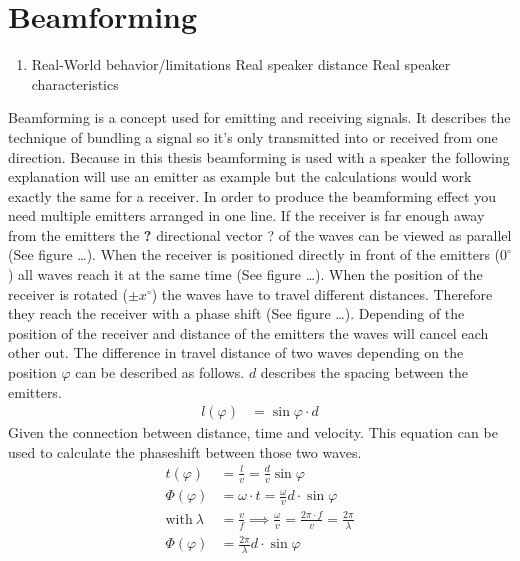 \section{Beamforming}\label{sec:theory:beam}

\begin{enumerate}
  \item Real-World behavior/limitations
  \subitem Real speaker distance
  \subitem Real speaker characteristics
\end{enumerate}

Beamforming is a concept used for emitting and receiving signals. It describes the technique of bundling a signal so it's only transmitted into or received from one direction. Because in this thesis beamforming is used with a speaker the following explanation will use an emitter as example but the calculations would work exactly the same for a receiver.\p
%
In order to produce the beamforming effect you need multiple emitters arranged in one line.
If the receiver is far enough away from the emitters the \textbf{?} directional vector ? of the waves can be viewed as parallel (See figure \dots). When the receiver is positioned directly in front of the emitters (\(0^\circ\)) all waves reach it at the same time (See figure \dots).
When the position of the receiver is rotated (\(\pm x^\circ\)) the waves have to travel different distances. Therefore they reach the receiver with a phase shift (See figure \dots). Depending of the position of the receiver and distance of the emitters the waves will cancel each other out.\p
%
The difference in travel distance of two waves depending on the position \(\varphi\) can be described as follows. \(d\) describes the spacing between the emitters.
%
\begin{align}
  l(\varphi) &= \sin \varphi \cdot d
\end{align}
%
Given the connection between distance, time and velocity. This equation can be used to calculate the phaseshift between those two waves.
%
\begin{align}
  t(\varphi)     &= \frac{l}{v} = \frac{d}{v} \sin \varphi \\[1em]
  \Phi(\varphi)  &= \omega \cdot t = \frac{\omega}{v} d \cdot \sin \varphi \\[1em]
  \mathrm{with~} \lambda &= \frac{v}{f} \implies \frac{\omega}{v} = \frac{2\pi \cdot f}{v} = \frac{2\pi}{\lambda} \\[1em]
  \Phi(\varphi)  &= \frac{2\pi}{\lambda} d \cdot \sin \varphi
\end{align}
